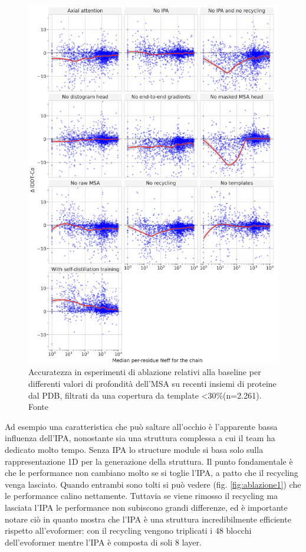 \begin{figure}[!htb]
	\centering
	\includegraphics[scale=0.7]{images/ablazione2.png}
	\caption{Accuratezza in esperimenti di ablazione relativi alla baseline per differenti valori di profondità dell'MSA su recenti insiemi di proteine dal PDB, filtrati da una copertura da template <30\%(n=2.261). Fonte \cite{supplementaryjumper2021highly}}
	\label{fig:ablazione-2}
\end{figure}

\par Ad esempio una caratteristica che può saltare all'occhio è l'apparente bassa influenza dell'IPA, nonostante sia una struttura complessa a cui il team  ha dedicato molto tempo. Senza IPA lo structure module si basa solo sulla rappresentazione 1D per la generazione della struttura. Il punto fondamentale è che le performance non cambiano molto se si toglie l'IPA, a patto che il recycling venga lasciato. Quando entrambi sono tolti si può vedere (fig. \ref{fig:ablazione1}) che le performance calino nettamente. Tuttavia se viene rimosso il recycling ma lasciata l'IPA le performance non subiscono grandi differenze, ed è importante notare ciò in quanto mostra che l'IPA è una struttura incredibilmente efficiente rispetto all'evoformer: con il recycling vengono triplicati i 48 blocchi dell'evoformer mentre l'IPA è composta di soli 8 layer.

